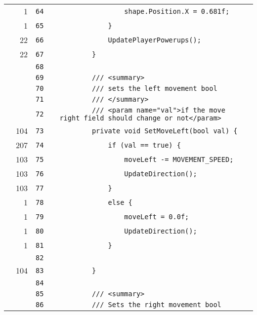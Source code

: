 \documentclass[a4paper,landscape,10pt]{article}
\begin{document}
\begin{longtable}[l]{lrrll}
\cellcolor{green} & 1 & \verb~64~ & & \verb~                shape.Position.X = 0.681f;~\\
\cellcolor{green} & 1 & \verb~65~ & & \verb~            }~\\
\cellcolor{green} & 22 & \verb~66~ & & \verb~            UpdatePlayerPowerups();~\\
\cellcolor{green} & 22 & \verb~67~ & & \verb~        }~\\
\cellcolor{gray} &  & \verb~68~ & & \verb~~\\
\cellcolor{gray} &  & \verb~69~ & & \verb~        /// <summary>~\\
\cellcolor{gray} &  & \verb~70~ & & \verb~        /// sets the left movement bool~\\
\cellcolor{gray} &  & \verb~71~ & & \verb~        /// </summary>~\\
\cellcolor{gray} &  & \verb~72~ & & \verb~        /// <param name="val">if the move right field should change or not</param>~\\
\cellcolor{green} & 104 & \verb~73~ & & \verb~        private void SetMoveLeft(bool val) {~\\
\cellcolor{green} & 207 & \verb~74~ & & \verb~            if (val == true) {~\\
\cellcolor{green} & 103 & \verb~75~ & & \verb~                moveLeft -= MOVEMENT_SPEED;~\\
\cellcolor{green} & 103 & \verb~76~ & & \verb~                UpdateDirection();~\\
\cellcolor{green} & 103 & \verb~77~ & & \verb~            }~\\
\cellcolor{green} & 1 & \verb~78~ & & \verb~            else {~\\
\cellcolor{green} & 1 & \verb~79~ & & \verb~                moveLeft = 0.0f;~\\
\cellcolor{green} & 1 & \verb~80~ & & \verb~                UpdateDirection();~\\
\cellcolor{green} & 1 & \verb~81~ & & \verb~            }~\\
\cellcolor{gray} &  & \verb~82~ & & \verb~~\\
\cellcolor{green} & 104 & \verb~83~ & & \verb~        }~\\
\cellcolor{gray} &  & \verb~84~ & & \verb~~\\
\cellcolor{gray} &  & \verb~85~ & & \verb~        /// <summary>~\\
\cellcolor{gray} &  & \verb~86~ & & \verb~        /// Sets the right movement bool~\\

\end{longtable}
\end{document}
